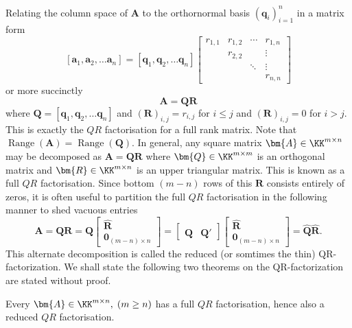 Relating the column space of $\bm{A}$ to the orthornormal basis $\left( \bm{q}_{i} \right)_{i=1}^{n}$ in a matrix form
\[
    \left[ \bm{a}_1 , \bm{a}_2 , \ldots \bm{a}_n \right] =
    \left[ \bm{q}_1 , \bm{q}_2 , \ldots \bm{q}_n \right]
    \begin{bmatrix}
        r_{1,1} & r_{1,2} & \cdots & r_{1,n} \\
                & r_{2,2} &        & \vdots  \\
                &         & \ddots & \vdots  \\
                &         &        & r_{n,n}
    \end{bmatrix}
\]
or more succinctly
\begin{equation}\label{eq: QR_factorisation}
    \bm{A} = \bm{Q} \bm{R}
\end{equation}
where $\bm{Q} = \left[ \bm{q}_1 , \bm{q}_2 , \ldots \bm{q}_n \right]$ and $\left( \bm{R} \right)_{i,j} = r_{i,j}$ for $i \leq j$ and $\left( \bm{R} \right)_{i,j} = 0$ for $i > j$. This is exactly the $QR$ factorisation for a full rank matrix. Note that $\operatorname{Range} \left( \bm{A} \right) = \operatorname{Range} \left( \bm{Q} \right)$. In general, any square matrix  $\bm{A} \in \KK^{m \times n}$ may be decomposed as $\bm{A} = \bm{Q} \bm{R}$ where $\bm{Q} \in \KK^{m \times m}$ is an orthogonal matrix and $\bm{R} \in \KK^{m \times n}$ is an upper triangular matrix. This is known as a full $QR$ factorisation. Since bottom $(m-n)$ rows of this $\bm{R}$ consists entirely of zeros, it is often useful to partition the full $QR$ factorisation in the following manner to shed vacuous entries
\[
    \bm{A} = \bm{Q} \bm{R} = \bm{Q}
    \begin{bmatrix}
        \hat{\bm{R}} \\
        \bm{0}_{(m-n) \times n}
    \end{bmatrix}
    =
    \begin{bmatrix}
        \hat{\bm{Q}} & \bm{Q}'
    \end{bmatrix}
    \begin{bmatrix}
        \hat{\bm{R}} \\
        \bm{0}_{(m-n) \times n}
    \end{bmatrix}
    = \hat{\bm{Q}} \hat{\bm{R}}.
\]
This alternate decomposition is called the reduced (or somtimes the thin) QR-factorization. We shall state the following two theorems on the QR-factorization are stated without proof.

\begin{thm} \label{theorem: QR_general_existence}
    Every $\bm{A} \in \KK^{m \times n}, \; (m \geq n)$ has a full $QR$ factorisation, hence also a reduced $QR$ factorisation.
    \cite{TrefethenLloydN.LloydNicholas1997Nla/}
\end{thm}

